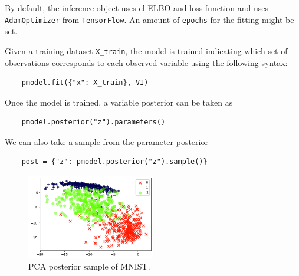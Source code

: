 By default, the inference object uses el ELBO and loss function and uses \texttt{AdamOptimizer} from \texttt{TensorFlow}. An amount of \texttt{epochs} for the fitting might be set.

Given a training dataset \texttt{X\_train}, the model is trained indicating which set of observations corresponds to each observed variable using the following syntax:
\begin{verbatim}
    pmodel.fit({"x": X_train}, VI)
\end{verbatim}

Once the model is trained, a variable posterior can be taken as
\begin{verbatim}
    pmodel.posterior("z").parameters()
\end{verbatim}

We can also take a sample from the parameter posterior 
\begin{verbatim}
    post = {"z": pmodel.posterior("z").sample()}
\end{verbatim}

\begin{figure}[h!]
    \centering
    \includegraphics[width=0.5\textwidth]{Chapters/InferPy/images/pca_mnist.png}
    \caption{PCA posterior sample of MNIST.}
\end{figure}
 